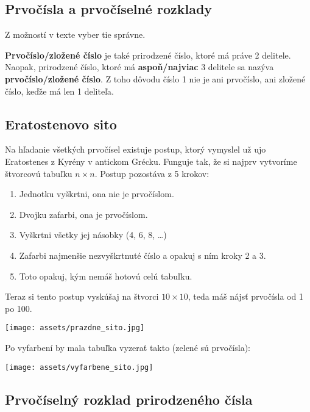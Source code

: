 \documentclass[12pt]{article}
\begin{document}
	\subsection{Prvočísla a prvočíselné rozklady}
	Z možností v texte vyber tie správne.
	\newline
	
	\qquad \textbf{Prvočíslo{/}zložené číslo} je také prirodzené číslo, ktoré má práve 2 delitele. Naopak, prirodzené číslo, ktoré má \textbf{aspoň{/}najviac} 3 delitele sa nazýva \textbf{prvočíslo{/}zložené číslo}. Z toho dôvodu číslo 1 nie je ani prvočíslo, ani zložené číslo, keďže má len 1 deliteľa.
	
	\subsection{Eratostenovo sito}
	
	\qquad 	Na hľadanie všetkých prvočísel existuje postup, ktorý vymyslel už ujo Eratostenes z Kyrény v antickom Grécku. Funguje tak, že si najprv vytvoríme štvorcovú tabuľku $n \times n$. Postup pozostáva z 5 krokov: 
	
	\begin{enumerate}
		\item Jednotku vyškrtni, ona nie je prvočíslom.
		\item Dvojku zafarbi, ona je prvočíslom.
		\item Vyškrtni všetky jej násobky (4, 6, 8, \dots)
		\item Zafarbi najmenšie nezvyškrtnuté číslo a opakuj s ním kroky 2 a 3.
		\item Toto opakuj, kým nemáš hotovú celú tabuľku.
	\end{enumerate}
	
	Teraz si tento postup vyskúšaj na štvorci $10 \times 10$, teda máš nájsť prvočísla od 1 po 100.
	\newline
	\begin{center}
		\texttt{[image: assets/prazdne\_sito.jpg]}
	\end{center}
	
	Po vyfarbení by mala tabuľka vyzerať takto (zelené sú prvočísla):
	\begin{center}
		\texttt{[image: assets/vyfarbene\_sito.jpg]}
	\end{center}
	
	\subsection{Prvočíselný rozklad prirodzeného čísla}
	
\end{document}
